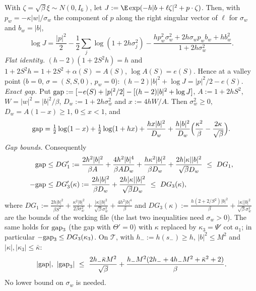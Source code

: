\begin{lemma}\label{tu:L-gauss}
With $\zeta=\sqrt\beta\xi\sim N(0,I_6)$, let $J:=\E\exp(-h|b+\ell\zeta|^2+p\cdot\zeta)$. Then, with
$p_w=-\kappa|w|/\sigma_w$ the component of $p$ along the right singular vector of $\ell$ for $\sigma_w$ and
$b_w=|b|$,
\[
\log J=\frac{|p|^2}2-\frac12\sum_j\log(1+2h\sigma_j^2)-\frac{hp_w^2\sigma_w^2+2h\sigma_wp_wb_w+hb_w^2}{1+2h\sigma_w^2}.
\]
\emph{Flat identity.} $(h-2)(1+2S^2h)=h$ and $1+2S^2h=1+2S^2+\alpha(S)=A(S)$, $\log A(S)=e(S)$. Hence at a
valley point ($b=0$, $\sigma=(S,S,0)$, $p_w=0$): $(h-2)|b|^2+\log J=|p|^2/2-e(S)$.
\emph{Exact gap.} Put ${\rm gap}:=[-e(S)+|p|^2/2]-[(h-2)|b|^2+\log J]$, $A:=1+2hS^2$, $W=|w|^2=|b|^2/\beta$,
$D_w:=1+2h\sigma_w^2$ and $x:=4hW/A$. Then $\sigma_w^2\ge0$, $D_w=A(1-x)\ge1$, $0\le x<1$, and
\begin{equation}\label{tu:L-gap-exact}
{\rm gap}=\tfrac12\log(1-x)+\tfrac12\log(1+hx)+\frac{hx|b|^2}{D_w}+\frac{h|b|^2}{D_w}\Big(\frac{\kappa^2}\beta-\frac{2\kappa}{\sqrt\beta}\Big).
\end{equation}
\emph{Gap bounds.} Consequently
\begin{align*}
{\rm gap}&\le DG_1':=\frac{2h^2|b|^2}{\beta A}+\frac{4h^2|b|^4}{\beta AD_w}+\frac{h\kappa^2|b|^2}{\beta D_w}+\frac{2h|\kappa||b|^2}{\sqrt\beta D_w}\ \le\ DG_1,\\
-{\rm gap}&\le DG_3'(\kappa):=\frac{2h|b|^2}{\beta D_w}+\frac{2h|\kappa||b|^2}{\sqrt\beta D_w}\ \le\ DG_3(\kappa),
\end{align*}
where $DG_1:=\frac{2h|b|^2}{\beta S^2}+\frac{\kappa^2|b|^2}{2\beta\sigma_w^2}+\frac{|\kappa||b|^2}{\sqrt\beta\sigma_w^2}+\frac{4h^2|b|^4}\beta$ and
$DG_3(\kappa):=\frac{h(2+2/S^2)|b|^2}\beta+\frac{|\kappa||b|^2}{\sqrt\beta\sigma_w^2}$ are the bounds of the working file (the last two
inequalities need $\sigma_w>0$). The same holds for ${\rm gap}_3$ (the gap with $\Theta'=0$) with $\kappa$ replaced by
$\kappa_3=\Psi'\cot a_1$; in particular $-{\rm gap}_3\le DG_3(\kappa_3)$. On $\mathcal T$, with $h_-:=h(s_-)\ge h$, $|b|^2\le M^2$ and
$|\kappa|,|\kappa_3|\le\bar\kappa$:
\begin{equation}\label{tu:L-gap-unif}
|{\rm gap}|,\ |{\rm gap}_3|\ \le\ \frac{2h_-\bar\kappa M^2}{\sqrt\beta}+\frac{h_-M^2(2h_-+4h_-M^2+\bar\kappa^2+2)}{\beta}.
\end{equation}
No lower bound on $\sigma_w$ is needed.
\end{lemma}

